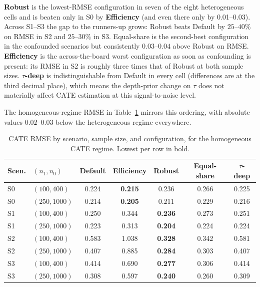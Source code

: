 \documentclass[11pt]{article}
\theoremstyle{plain}
\theoremstyle{definition}
\theoremstyle{remark}
\newcommand{\1}{\mathds{1}}
\begin{document}
\textbf{Robust} is the lowest-RMSE configuration in seven of the eight
heterogeneous cells and is beaten only in S0 by \textbf{Efficiency} (and
even there only by 0.01--0.03). Across S1--S3 the gap to the runners-up
grows: Robust beats Default by $25\text{--}40\%$ on RMSE in S2 and
$25\text{--}30\%$ in S3. Equal-share is the second-best configuration in
the confounded scenarios but consistently $0.03$--$0.04$ above Robust on
RMSE. \textbf{Efficiency} is the across-the-board worst configuration as
soon as confounding is present: its RMSE in S2 is roughly three times
that of Robust at both sample sizes. \textbf{$\tau$-deep} is
indistinguishable from Default in every cell (differences are at the
third decimal place), which means the depth-prior change on $\tau$ does
not materially affect CATE estimation at this signal-to-noise level.

The homogeneous-regime RMSE in Table~\ref{tab:sim-prior-rmse-homog}
mirrors this ordering, with absolute values $0.02$--$0.03$ below the
heterogeneous regime everywhere.

\begin{table}[tb]
\centering
\small
\caption{CATE RMSE by scenario, sample size, and configuration, for the
homogeneous CATE regime. Lowest per row in bold.}
\label{tab:sim-prior-rmse-homog}
\begin{tabular}{llccccc}
\toprule
Scen. & $(n_1, n_0)$  & Default & Efficiency      & Robust          & Equal-share     & $\tau$-deep \\
\midrule
S0    & $(100, 400)$  & 0.224   & \textbf{0.215}  & 0.236           & 0.266           & 0.225       \\
S0    & $(250, 1000)$ & 0.214   & \textbf{0.205}  & 0.211           & 0.229           & 0.216       \\
\midrule
S1    & $(100, 400)$  & 0.250   & 0.344           & \textbf{0.236}  & 0.273           & 0.251       \\
S1    & $(250, 1000)$ & 0.223   & 0.313           & \textbf{0.204}  & 0.224           & 0.224       \\
\midrule
S2    & $(100, 400)$  & 0.583   & 1.038           & \textbf{0.328}  & 0.342           & 0.581       \\
S2    & $(250, 1000)$ & 0.407   & 0.885           & \textbf{0.284}  & 0.303           & 0.407       \\
\midrule
S3    & $(100, 400)$  & 0.414   & 0.690           & \textbf{0.277}  & 0.306           & 0.414       \\
S3    & $(250, 1000)$ & 0.308   & 0.597           & \textbf{0.240}  & 0.260           & 0.309       \\
\bottomrule
\end{tabular}
\end{table}
\end{document}
